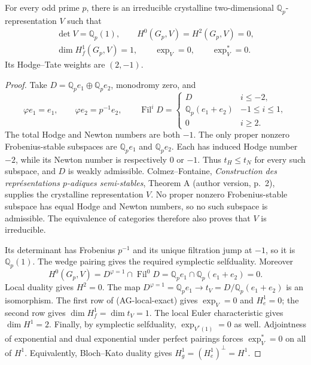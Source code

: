 \begin{proposition}
For every odd prime $p$, there is an irreducible crystalline
two-dimensional $\mathbb Q_p$-representation $V$ such that
\[
 \begin{gathered}
 \det V=\mathbb Q_p(1),\qquad
 H^0(G_p,V)=H^2(G_p,V)=0,\\
 \dim H_f^1(G_p,V)=1,\qquad
 \exp_V=0,\qquad\exp_V^*=0.
 \end{gathered}
\]
Its Hodge--Tate weights are $(2,-1)$.
\end{proposition}
\begin{proof}
Take $D=\mathbb Q_pe_1\oplus\mathbb Q_pe_2$, monodromy zero,
and
\[
 \varphi e_1=e_1,\qquad \varphi e_2=p^{-1}e_2,
 \qquad
 \operatorname{Fil}^iD=
 \begin{cases}
 D&i\le-2,\\
 \mathbb Q_p(e_1+e_2)&-1\le i\le1,\\
 0&i\ge2.
 \end{cases}
\tag{AG-local-example}
\]
The total Hodge and Newton numbers are both $-1$.
The only proper nonzero Frobenius-stable subspaces are
$\mathbb Q_pe_1$ and $\mathbb Q_pe_2$.  Each has induced
Hodge number $-2$, while its Newton number is respectively
$0$ or $-1$.  Thus $t_H\le t_N$ for every such subspace,
and $D$ is weakly admissible.  Colmez--Fontaine,
\emph{Construction des représentations $p$-adiques
semi-stables}, Theorem A (author version, p.~2), supplies
the crystalline representation $V$.  No proper nonzero
Frobenius-stable subspace has equal Hodge and Newton numbers,
so no such subspace is admissible.  The equivalence of
categories therefore also proves that $V$ is irreducible.

Its determinant has Frobenius $p^{-1}$ and its unique
filtration jump at $-1$, so it is $\mathbb Q_p(1)$.
The wedge pairing gives the required symplectic selfduality.
Moreover
\[
 H^0(G_p,V)=D^{\varphi=1}\cap\operatorname{Fil}^0D
   =\mathbb Q_pe_1\cap\mathbb Q_p(e_1+e_2)=0.
\]
Local duality gives $H^2=0$.  The map
$D^{\varphi=1}=\mathbb Q_pe_1\to
t_V=D/\mathbb Q_p(e_1+e_2)$ is an isomorphism.
The first row of (AG-local-exact) gives $\exp_V=0$ and
$H_e^1=0$; the second row gives $\dim H_f^1=\dim t_V=1$.
The local Euler characteristic gives $\dim H^1=2$.
Finally, by symplectic selfduality,
$\exp_{V^*(1)}=0$ as well.  Adjointness of exponential and
dual exponential under perfect pairings forces
$\exp_V^*=0$ on all of $H^1$.  Equivalently,
Bloch--Kato duality gives $H_g^1=(H_e^1)^\perp=H^1$.
\end{proof}

